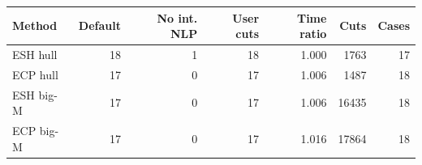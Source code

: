 \begin{tabular}{lrrrrrr}
\toprule
Method & Default & No int. NLP & User cuts & Time ratio & Cuts & Cases \\
\midrule
ESH hull & 18 & 1 & 18 & 1.000 & 1763 & 17 \\
ECP hull & 17 & 0 & 17 & 1.006 & 1487 & 18 \\
ESH big-M & 17 & 0 & 17 & 1.006 & 16435 & 18 \\
ECP big-M & 17 & 0 & 17 & 1.016 & 17864 & 18 \\
\bottomrule
\end{tabular}

